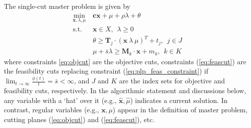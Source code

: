\documentclass[opre,nonblindrev]{informs3} %
\newcommand{\x}{\mathbf{x}}
\newcommand{\xh}{\hat{\x}}
\newcommand{\mh}{\hat{\mu}}
\renewcommand{\c}{\mathbf{c}}
\newcommand{\T}{\mathbf{T}}
\newcommand{\M}{\mathbf{M}}
\newcommand{\st}{\mbox{s.t.}}
\begin{document}
The single-cut master problem is given by
\begin{align}
	\min_{\x,\lambda,\mu} \ & \c\x + \mu + \rho \lambda + \theta \label{eq:master_problem}\\
	\st \ & \x \in X,\ \ \lambda \geq 0 \nonumber  \\
	& \theta \geq \T_j \cdot (\x\ \lambda\ \mu)^T + t_j, \ \  j \in J  \label{eq:objcut} \\
	& \mu + \bar{s}\lambda \geq \M_k \cdot \x + m_k, \ \ k \in K \label{eq:feascut} 
\end{align}
where constraints \eqref{eq:objcut} are the objective cuts, constraints  (\ref{eq:feascut}) are the feasibility cuts replacing constraint (\ref{eq:plp_feas_constraint}) if $\lim_{t \rightarrow \infty} \frac{\phi(t)}{t} =\bar{s} < \infty$, and $J$ and $K$ are the index sets for objective and feasibility cuts, respectively.
In the algorithmic statement and discussions below, any variable with a `hat' over it (e.g., $\xh, \mh$) indicates a current solution.
In contrast, regular variables (e.g., $\x, \mu$) appear in the definition of master problem, cutting planes (\ref{eq:objcut}) and (\ref{eq:feascut}), etc. 
\medskip
\end{document}
